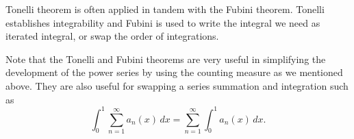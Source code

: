 \documentclass[12pt,openany]{book}
\theoremstyle{plain}
\theoremstyle{remark}
\theoremstyle{definition}
\theoremstyle{exercise}
\theoremstyle{example}
\begin{document}
Tonelli theorem is often applied in tandem with the Fubini theorem.  Tonelli
establishes integrability and Fubini is used to write the integral we need
as iterated integral, or swap the order of integrations.

Note that the Tonelli and Fubini theorems are very useful in simplifying the
development of the power series by using the counting measure as we
mentioned above.  They are also useful for swapping a series summation and
integration such as
\begin{equation*}
\int_0^1 \sum_{n=1}^\infty a_n(x) \, dx
=
\sum_{n=1}^\infty \int_0^1 a_n(x) \, dx .
\end{equation*}



\def\myDOI#1{\href{http://dx.doi.org/#1}{#1}}
\end{document}
